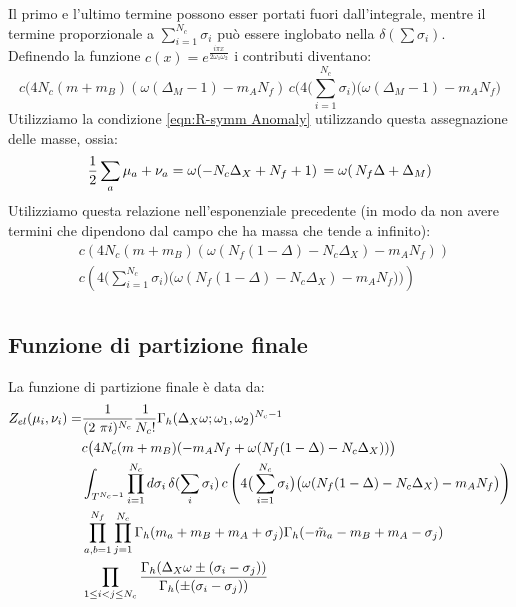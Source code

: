 \documentclass[a4paper,12pt]{article}
\begin{document}
Il primo e l'ultimo termine possono esser portati fuori dall'integrale, mentre il termine proporzionale a $ \sum_{i=1}^{N_c}	\sigma_i  $ può essere inglobato nella $\delta( \sum \sigma_i)$.\\
Definendo la funzione $ c(x) = e^{ \frac{i \pi x }{2 \omega_1 \omega_2}}$ i contributi diventano:
$$
c( 4 N_c  ( m  + m_B ) ( \omega (\Delta_M - 1) -  m_A N_f )\,  c( 4\big( \sum_{i=1}^{N_c}	 \sigma_i  \big) \big (\omega (\Delta_M - 1) -  m_A N_f \big)
$$
Utilizziamo la condizione \ref{eqn:R-symm Anomaly} utilizzando questa assegnazione delle masse, ossia:
\begin{equation}
  { 1 \over 2 } \sum_a \mu_a + \nu_a  = \omega ( -N_c \Delta_X + N_f + 1 )  \, =\omega( \, N_f \Delta +  \Delta_M )
\end{equation}
Utilizziamo questa relazione nell'esponenziale precedente (in modo da non avere termini che dipendono dal campo che ha massa che tende a infinito):
\begin{align*}
&c \left( 4 N_c  ( m  + m_B ) ( \omega ( N_f (1 - \Delta)  - N_c \Delta_X ) -  m_A N_f )\right)\,  \\
&c\left( 4\big( \sum_{i=1}^{N_c}	 \sigma_i  \big) \big ( \omega( N_f (1 - \Delta)  - N_c \Delta_X)  -  m_A N_f ) \big) \right)\\
\end{align*}



\subsection{Funzione di partizione finale}
La funzione di partizione finale è data da:
\begin{align*}
 Z_{el} ( \mu_i , \nu_i ) = &
 \frac{1}{ (2 \ \pi i)^{N_c} }{1 \over N_c ! } 
\Gamma_h ( \Delta_X \omega ; \omega_1 , \omega_2)^{N_c-1} \\
& c \big( 4 N_c  ( m  + m_B ) (-  m_A N_f   + \omega ( N_f (1 - \Delta)  - N_c \Delta_X ) ) \big) \\
&\int_{T^{N_c-1}}  
\prod_{i=1}^{N_c} d \sigma_i \, \delta( \sum_i \sigma_i) \,  c \left( 4\big( \sum_{i=1}^{N_c}	 \sigma_i  \big) \big( \omega( N_f (1 - \Delta)  - N_c \Delta_X)  -  m_A N_f \big) \right)\\
& \prod_{a,b=1}^{N_f} \prod_{j=1}^{N_c} \Gamma_h ( m_a + m_B + m_A + \sigma_j) \Gamma_h ( -\tilde{m}_a -m_B + m_A - \sigma_j)\\
 &  \prod_{ 1 \leq i<j \leq N_c} \frac{ \Gamma_h( \Delta_X \omega \pm (\sigma_i - \sigma_j)) }{ \Gamma_h ( \pm (\sigma_i - \sigma_j) )} 
 \end{align*}
\end{document}
